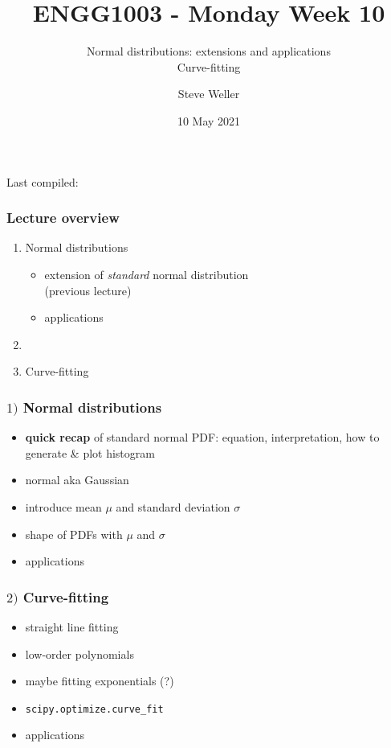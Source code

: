 \documentclass[english,14pt]{beamer}
\title{ENGG1003 - Monday Week 10}
\subtitle{Normal distributions: extensions and applications \\ Curve-fitting}%
\author{Steve Weller}
\institute{University of Newcastle}
\date{10 May 2021}
\begin{document}
\begin{flushleft}
{\scriptsize Last compiled:~\DTMnow}
\vspace*{-5mm}
\end{flushleft}
\framebreak


\begin{frame}[fragile]

\frametitle{Lecture overview}
\begin{enumerate}
	\item Normal distributions

		\begin{itemize}
			\item extension of \emph{standard} normal distribution \\ (previous lecture)
			\item applications

		\end{itemize}
	
	\item[]
	
	\item Curve-fitting
	
\end{enumerate}

\end{frame}


\begin{frame}[fragile]

\frametitle{$1)$ Normal distributions}

\begin{itemize}
	\item \textbf{quick recap} of standard normal PDF: equation, interpretation, how to generate \& plot histogram
	\item normal aka Gaussian
	\item introduce mean $\mu$ and standard deviation $\sigma$
	\item shape of PDFs with $\mu$ and $\sigma$
	\item applications
\end{itemize}

\end{frame}


\begin{frame}[fragile]

\frametitle{$2)$ Curve-fitting}

\begin{itemize}
	\item straight line fitting
	\item low-order polynomials
	\item maybe fitting exponentials (?)
	\item \texttt{scipy.optimize.curve\_fit}
	\item applications
\end{itemize}

\end{frame}
\end{document}
